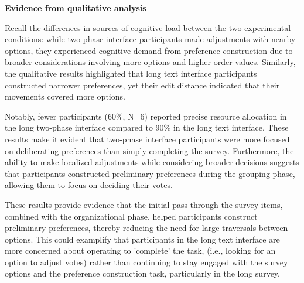\textbf{Evidence from qualitative analysis}

Recall the differences in sources of cognitive load between the two experimental conditions: while two-phase interface participants made adjustments with nearby options, they experienced cognitive demand from preference construction due to broader considerations involving more options and higher-order values. Similarly, the qualitative results highlighted that long text interface participants constructed narrower preferences, yet their edit distance indicated that their movements covered more options.

Notably, fewer participants (60\%, N=6) reported precise resource allocation in the long two-phase interface compared to 90\% in the long text interface. These results make it evident that two-phase interface participants were more focused on deliberating preferences than simply completing the survey. Furthermore, the ability to make localized adjustments while considering broader decisions suggests that participants constructed preliminary preferences during the grouping phase, allowing them to focus on deciding their votes.

These results provide evidence that the initial pass through the survey items, combined with the organizational phase, helped participants construct preliminary preferences, thereby reducing the need for large traversals between options. This could examplify that participants in the long text interface are more concerned about operating to 'complete' the task, (i.e., looking for an option to adjust votes) rather than continuing to stay engaged with the survey options and the preference construction task, particularly in the long survey.

